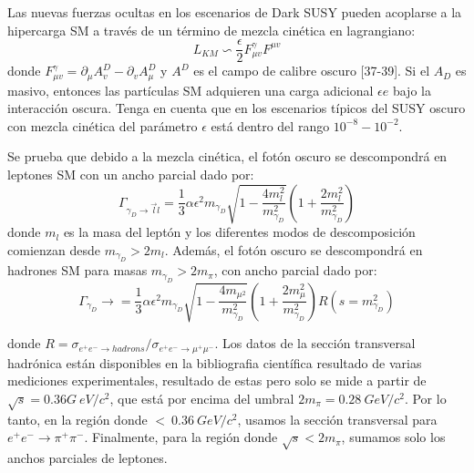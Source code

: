 Las nuevas fuerzas ocultas en los escenarios de Dark SUSY pueden acoplarse a la hipercarga SM a través de un término de mezcla cinética en lagrangiano:
\begin{equation}
\label{an-15-455:ec3}
L_{KM}\backsim \dfrac{\epsilon}{2} F_{\mu v}^{\gamma} F^{\mu v}
\end{equation}
donde $F_{\mu v}^{\gamma} = \partial_\mu A_v^{D} -\partial_v A_\mu^D$ y $A^D$ es el campo de calibre oscuro [37-39]. Si el $A_D$ es masivo, entonces las partículas SM adquieren una carga adicional $\epsilon e$ bajo la interacción oscura. Tenga en cuenta que en los escenarios típicos del SUSY oscuro con mezcla cinética del parámetro $\epsilon$ está dentro del rango $10^{-8}-10^{-2}$. 

Se prueba que debido a la mezcla cinética, el fotón oscuro se descompondrá en leptones SM con un ancho parcial dado por:
\begin{equation}
\label{an-15-455:ec4}
\Gamma_{\gamma_D \rightarrow \vec{l}l} = \dfrac{1}{3}\alpha \epsilon^2 m_{\gamma_D} \sqrt{1- \dfrac{4m_l^2}{m_{\gamma_D}^2}}
\left( 1 + \dfrac{2m_l^2}{m_{\gamma_D}^2}\right) 
\end{equation}
donde $m_l$ es la masa del leptón y los diferentes modos de descomposición comienzan desde $m_{\gamma_D} > 2 m_l$. Además, el fotón oscuro se descompondrá en hadrones SM para masas $m_{\gamma_D} > 2 m_\pi$, con ancho parcial dado por:
\begin{equation}
\label{an-15-455:ec5}
\Gamma_{\gamma_D} \rightarrow = \dfrac{1}{3} \alpha \epsilon^2 m_{\gamma_D} \sqrt{1 -\dfrac{4 m_{\mu^2}}{m_{\gamma_D}^2}} \left( 1 + \dfrac{2 m_\mu^2}{m_{\gamma_D}^2}\right) R(s = m_{\gamma_D}^2)
\end{equation}

donde $R = \sigma_{e^+ e^- \rightarrow hadrons} / \sigma_{e^+ e^- \rightarrow \mu^+ \mu^-}$. Los datos de la sección transversal hadrónica están disponibles en la bibliografia científica resultado de varias mediciones experimentales, resultado de estas pero solo se mide a partir de $\sqrt{s}= 0.36G ~ eV / c^2$, que está por encima del umbral $2 m_\pi = 0.28~GeV / c^2$. Por lo tanto, en la región donde $ < ~ 0.36~GeV / c^2$, usamos la sección transversal para $e^+e^- \rightarrow \pi^+\pi^-$. Finalmente, para la región donde $\sqrt{s} < 2 m_\pi$, sumamos solo los anchos parciales de leptones.

